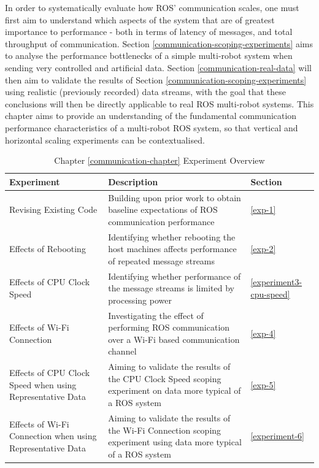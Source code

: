 \documentclass{l4proj}
\begin{document}
In order to systematically evaluate how ROS' communication scales, one must first aim to understand which aspects of the system that are of greatest importance to performance - both in terms of latency of messages, and total throughput of communication. Section \ref{communication-scoping-experiments} aims to analyse the performance bottlenecks of a simple multi-robot system when sending very controlled and artificial data. Section \ref{communication-real-data} will then aim to validate the results of Section \ref{communication-scoping-experiments} using realistic (previously recorded) data streams, with the goal that these conclusions will then be directly applicable to real ROS multi-robot systems. This chapter aims to provide an understanding of the fundamental communication performance characteristics of a multi-robot ROS system, so that vertical and horizontal scaling experiments can be contextualised.

\begin{table}[H]
\centering
\caption{Chapter \ref{communication-chapter} Experiment Overview}
\label{communication-experiment-overview}
\begin{tabular}{|p{}|p{}|p{}|}
\hline
\textbf{Experiment}         & \textbf{Description}                                                                              & \textbf{Section}              \\ \hline
Revising Existing Code      & Building upon prior work to obtain baseline expectations of ROS communication performance         & \ref{exp-1}                 \\ \hline
Effects of Rebooting        & Identifying whether rebooting the host machines affects performance of repeated message streams   & \ref{exp-2}                 \\ \hline
Effects of CPU Clock Speed  & Identifying whether performance of the message streams is limited by processing power             & \ref{experiment3-cpu-speed} \\ \hline
Effects of Wi-Fi Connection & Investigating the effect of performing ROS communication over a Wi-Fi based communication channel & \ref{exp-4}                 \\ \hline
Effects of CPU Clock Speed when using Representative Data & Aiming to validate the results of the CPU Clock Speed scoping experiment on data more typical of a ROS system  & \ref{exp-5} \\ \hline
Effects of Wi-Fi Connection when using Representative Data & Aiming to validate the results of the Wi-Fi Connection scoping experiment using data more typical of a ROS system & \ref{experiment-6} \\ \hline

\end{tabular}
\end{table}
\end{document}
